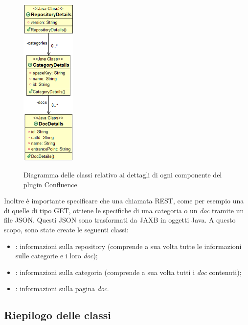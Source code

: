 \begin{figure}[H]
    \centering
    \includegraphics[width=0.24\textwidth]{immagini/details.png}\\
    \caption{Diagramma delle classi relativo ai dettagli di ogni componente del plugin Confluence}
\end{figure}

Inoltre è importante specificare che una chiamata REST, come per esempio una di quelle di tipo GET, ottiene le specifiche di una categoria o un \emph{doc} tramite un file JSON.
Questi JSON sono trasformati da JAXB in oggetti Java.
A questo scopo, sono state create le seguenti classi:
\begin{itemize}
    \item {}: informazioni sulla repository (comprende a sua volta tutte le informazioni sulle categorie e i loro \emph{doc});
    \item {}: informazioni sulla categoria (comprende a sua volta tutti i \emph{doc} contenuti);
    \item {}: informazioni sulla pagina \emph{doc}.
\end{itemize}



    \subsection{Riepilogo delle classi}

